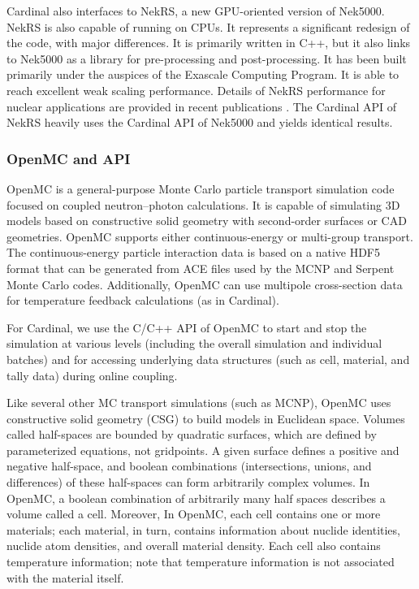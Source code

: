 Cardinal also interfaces to NekRS, a new GPU-oriented version of Nek5000. NekRS is also capable of running on CPUs. It represents a significant redesign of the code, with major differences. It is primarily written in C++, but it also links to Nek5000 as a library for pre-processing and post-processing. It has been built primarily under the auspices of the Exascale Computing Program. It is able to reach excellent weak scaling performance. Details of NekRS performance for nuclear applications are provided in recent publications \cite{merzari2020toward}. The Cardinal API of NekRS heavily uses the Cardinal API of Nek5000 and yields identical results.


\subsubsection{OpenMC and API}

OpenMC \cite{romano2015openmc} is a general-purpose Monte Carlo particle transport simulation code focused on coupled neutron--photon calculations. It is
capable of simulating 3D models based on constructive solid geometry with second-order surfaces or CAD geometries. OpenMC
supports either continuous-energy or multi-group transport. The continuous-energy particle interaction data
is based on a native HDF5 format that can be generated from ACE files used by the MCNP and Serpent
Monte Carlo codes. Additionally, OpenMC can use multipole cross-section data for temperature feedback
calculations (as in Cardinal).

For Cardinal, we use the C/C++ API of OpenMC to start and stop the simulation at various levels (including the overall
simulation and individual batches) and for accessing underlying data structures (such as cell, material, and
tally data) during online coupling.

Like several other MC transport simulations (such as MCNP), OpenMC uses constructive solid geometry (CSG) to build models in Euclidean space.
Volumes called half-spaces are bounded by quadratic surfaces, which are defined by parameterized equations, not gridpoints. A given surface defines a positive and negative half-space, and boolean combinations (intersections, unions, and differences) of these half-spaces can form arbitrarily complex volumes. In OpenMC, a boolean combination of arbitrarily many half spaces describes a volume called a cell. Moreover, In OpenMC, each cell contains one or more materials; each material, in turn, contains information about nuclide identities, nuclide atom densities, and overall material density. Each cell also contains temperature information; note that temperature information is not associated with the material itself.

